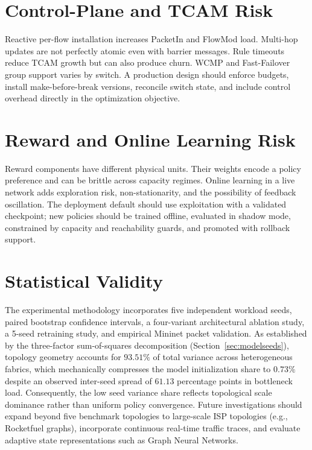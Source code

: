\documentclass[12pt,a4paper,oneside]{report}
\begin{document}
\section{Control-Plane and TCAM Risk}
Reactive per-flow installation increases PacketIn and FlowMod load. Multi-hop updates are not perfectly atomic even with barrier messages. Rule timeouts reduce TCAM growth but can also produce churn. WCMP and Fast-Failover group support varies by switch. A production design should enforce budgets, install make-before-break versions, reconcile switch state, and include control overhead directly in the optimization objective.

\section{Reward and Online Learning Risk}
Reward components have different physical units. Their weights encode a policy preference and can be brittle across capacity regimes. Online learning in a live network adds exploration risk, non-stationarity, and the possibility of feedback oscillation. The deployment default should use exploitation with a validated checkpoint; new policies should be trained offline, evaluated in shadow mode, constrained by capacity and reachability guards, and promoted with rollback support.

\section{Statistical Validity}
The experimental methodology incorporates five independent workload seeds, paired bootstrap confidence intervals, a four-variant architectural ablation study, a 5-seed retraining study, and empirical Mininet packet validation. As established by the three-factor sum-of-squares decomposition (Section~\ref{sec:modelseeds}), topology geometry accounts for $93.51\%$ of total variance across heterogeneous fabrics, which mechanically compresses the model initialization share to $0.73\%$ despite an observed inter-seed spread of $61.13$ percentage points in bottleneck load. Consequently, the low seed variance share reflects topological scale dominance rather than uniform policy convergence. Future investigations should expand beyond five benchmark topologies to large-scale ISP topologies (e.g., Rocketfuel graphs), incorporate continuous real-time traffic traces, and evaluate adaptive state representations such as Graph Neural Networks.

\end{document}
